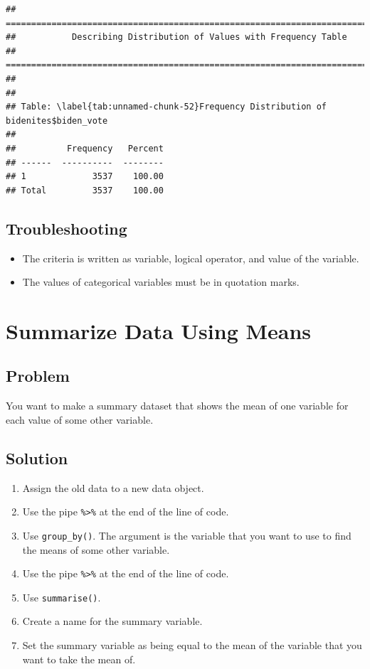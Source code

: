 \documentclass[
]{book}
\providecommand{\tightlist}{%
  \setlength{\itemsep}{0pt}\setlength{\parskip}{0pt}}
\begin{document}
\begin{verbatim}
## ===========================================================================
##           Describing Distribution of Values with Frequency Table
## ===========================================================================
## 
## 
## Table: \label{tab:unnamed-chunk-52}Frequency Distribution of bidenites$biden_vote
## 
##          Frequency   Percent
## ------  ----------  --------
## 1             3537    100.00
## Total         3537    100.00
\end{verbatim}

\hypertarget{troubleshooting-18}{%
\subsection{Troubleshooting}\label{troubleshooting-18}}

\begin{itemize}
\tightlist
\item
  The criteria is written as variable, logical operator, and value of the variable.
\item
  The values of categorical variables must be in quotation marks.
\end{itemize}

\hypertarget{sum}{%
\section{Summarize Data Using Means}\label{sum}}

\hypertarget{problem-22}{%
\subsection{Problem}\label{problem-22}}

You want to make a summary dataset that shows the mean of one variable for each value of some other variable.

\hypertarget{solution-21}{%
\subsection{Solution}\label{solution-21}}

\begin{enumerate}
\def\labelenumi{\arabic{enumi}.}
\tightlist
\item
  Assign the old data to a new data object.
\item
  Use the pipe \texttt{\%\textgreater{}\%} at the end of the line of code.
\item
  Use \texttt{group\_by()}. The argument is the variable that you want to use to find the means of some other variable.
\item
  Use the pipe \texttt{\%\textgreater{}\%} at the end of the line of code.
\item
  Use \texttt{summarise()}.
\item
  Create a name for the summary variable.
\item
  Set the summary variable as being equal to the mean of the variable that you want to take the mean of.
\end{enumerate}
\end{document}
